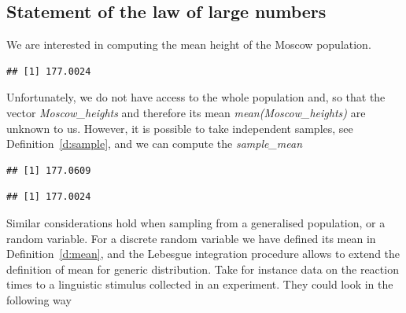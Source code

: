 	\subsection{Statement of the law of large numbers }
	We are interested in computing the mean height of the Moscow population. 
\begin{knitrout}
\color{fgcolor}\begin{kframe}
\begin{alltt}
 \hlkwb{<-} 
 \hlkwb{<-} \hlopt{*} \hlopt{+} 
\end{alltt}
\begin{verbatim}
## [1] 177.0024
\end{verbatim}
\end{kframe}
\end{knitrout}
	Unfortunately, we do not have access to the whole population and, so that the vector  \textit{Moscow\_heights} and therefore its mean \textit{mean(Moscow\_heights)} are unknown to us. However, it is possible to take independent samples, see Definition~\ref{d:sample}, and we can compute the \textit{sample\_mean} 
\begin{knitrout}
\color{fgcolor}\begin{kframe}
\begin{alltt}
 \hlkwb{<-}   
 \hlkwb{<-} 
 \hlkwb{<-} 
\end{alltt}
\begin{verbatim}
## [1] 177.0609
\end{verbatim}
\begin{alltt}
\end{alltt}
\begin{verbatim}
## [1] 177.0024
\end{verbatim}
\end{kframe}
\end{knitrout}
	Similar considerations hold when sampling from a generalised population, or a random variable. For a discrete random variable we have defined its mean in Definition~\ref{d:mean}, and the Lebesgue integration procedure allows to extend the definition of mean for generic distribution. Take for instance data on the reaction times to a linguistic stimulus collected in an experiment. They could look in the following way
